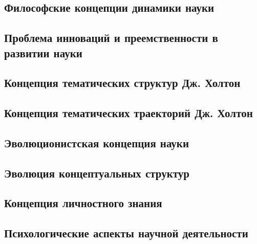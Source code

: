\documentclass[main.tex]{subfiles}
\begin{document}


\subsection{Философские концепции динамики науки}


\subsection{Проблема инноваций и преемственности в развитии науки}


\subsection{Концепция тематических структур Дж. Холтон}


\subsection{Концепция тематических траекторий Дж. Холтон}


\subsection{Эволюционистская концепция науки}


\subsection{Эволюция концептуальных структур}


\subsection{Концепция личностного знания}



\subsection{Психологические аспекты научной деятельности}






\end{document}
